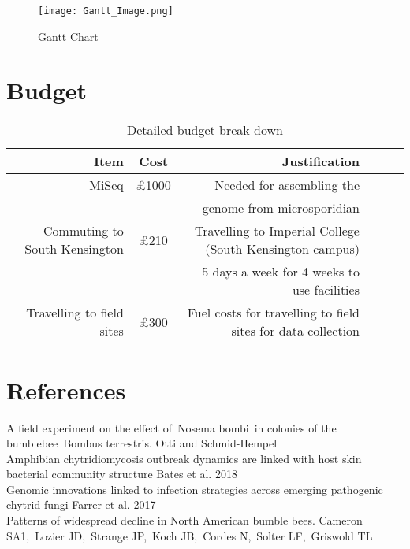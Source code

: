 \documentclass[11pt]{article}
\newcommand{\ra}[1]{\renewcommand{\arraystretch}{#1}}
\begin{document}
\begin{figure}[h!]
	
	\texttt{[image: Gantt\_Image.png]}
	\caption{	Gantt Chart}
	\label{MRes Gantt}
	
\end{figure} 

\newpage
	\section{Budget}

	\begin{table*}[h]\centering
	\ra{1.3}
		\begin{tabular} {@{}rcrcrc@{}}\toprule
		\hline
		\textbf{Item} & \textbf{Cost} & \textbf{Justification} \\
		\hline\hline
		MiSeq & \pounds1000 & Needed for assembling the \\
		& & genome from microsporidian \\
		\hline
		Commuting to South Kensington & \pounds210 &	Travelling to Imperial College (South Kensington campus) \\
		& & 5 days a week for 4 weeks to use facilities \\
		\hline
		Travelling to field sites & \pounds300 & Fuel costs for travelling to field sites for data collection\\
		\hline
		\bottomrule
		\end{tabular}
	\caption{Detailed budget break-down}
	\end{table*}

	  
\newpage

	\section{References}
A field experiment on the effect of Nosema bombi in colonies of the bumblebee Bombus terrestris. Otti and Schmid-Hempel \\

Amphibian chytridiomycosis outbreak dynamics are linked with host skin bacterial community structure Bates et al. 2018 \\ 

Genomic innovations linked to infection strategies across emerging pathogenic chytrid fungi Farrer et al. 2017 \\

Patterns of widespread decline in North American bumble bees. Cameron SA1, Lozier JD, Strange JP, Koch JB, Cordes N, Solter LF, Griswold TL \\
\end{document}
